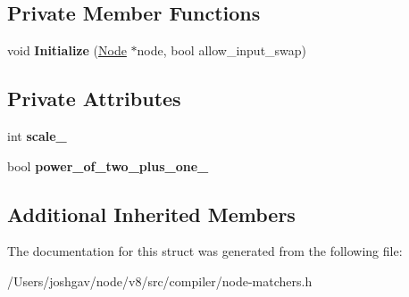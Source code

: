 \subsection*{Private Member Functions}
\begin{DoxyCompactItemize}
\item 
void {\bfseries Initialize} (\hyperlink{classv8_1_1internal_1_1compiler_1_1_node}{Node} $\ast$node, bool allow\+\_\+input\+\_\+swap)\hypertarget{structv8_1_1internal_1_1compiler_1_1_add_matcher_a448de8a5819c4a646080184d291ca83a}{}\label{structv8_1_1internal_1_1compiler_1_1_add_matcher_a448de8a5819c4a646080184d291ca83a}

\end{DoxyCompactItemize}
\subsection*{Private Attributes}
\begin{DoxyCompactItemize}
\item 
int {\bfseries scale\+\_\+}\hypertarget{structv8_1_1internal_1_1compiler_1_1_add_matcher_a901617772c720dddb9eb2f1ad10a58c2}{}\label{structv8_1_1internal_1_1compiler_1_1_add_matcher_a901617772c720dddb9eb2f1ad10a58c2}

\item 
bool {\bfseries power\+\_\+of\+\_\+two\+\_\+plus\+\_\+one\+\_\+}\hypertarget{structv8_1_1internal_1_1compiler_1_1_add_matcher_ac200c9a0db1de369be51649fb5fa5702}{}\label{structv8_1_1internal_1_1compiler_1_1_add_matcher_ac200c9a0db1de369be51649fb5fa5702}

\end{DoxyCompactItemize}
\subsection*{Additional Inherited Members}


The documentation for this struct was generated from the following file\+:\begin{DoxyCompactItemize}
\item 
/\+Users/joshgav/node/v8/src/compiler/node-\/matchers.\+h\end{DoxyCompactItemize}
